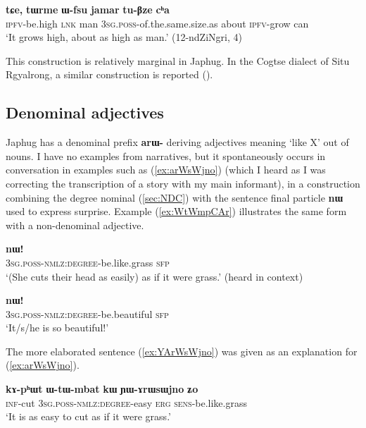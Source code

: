 \documentclass[oneside,a4paper,11pt]{article}
\newcommand{\ipa}[1]{{\phon\textbf{#1}}}
\begin{document}
\begin{exe}
\ex \label{ex:Wfsu}
\gll \ipa{tu-mbro} 	\ipa{tɕe,} 	\ipa{tɯrme} 	\ipa{ɯ-fsu} 	\ipa{jamar} 	\ipa{tu-βze} 	\ipa{cʰa} \\
\textsc{ipfv}-be.high \textsc{lnk} man \textsc{3sg.poss}-of.the.same.size.as about \textsc{ipfv}-grow can \\
\glt `It grows high, about as high as man.' (12-ndZiNgri, 4)
\end{exe}

This construction is relatively marginal in Japhug. In the Cogtse dialect of Situ Rgyalrong, a similar construction is reported (\citealt[377]{linxr93jiarong}).

\subsection{Denominal adjectives} \label{sec:denominal}
Japhug has a denominal prefix \ipa{arɯ-} deriving adjectives meaning `like X' out of nouns. I have no examples from narratives, but it spontaneously occurs in conversation  in examples such as (\ref{ex:arWsWjno}) (which I heard as I was correcting the transcription of a story with my main informant), in a construction combining the degree nominal (\ref{sec:NDC}) with the sentence final particle \ipa{nɯ} used to express surprise. Example (\ref{ex:WtWmpCAr}) illustrates the same form with a non-denominal adjective.

\begin{exe}
\ex \label{ex:arWsWjno}
\gll \ipa{ɯ-tɯ-ɤrɯsɯjno} 	\ipa{nɯ!}  \\
\textsc{3sg.poss-nmlz:degree}-be.like.grass \textsc{sfp} \\
\glt `(She cuts their head as easily) as if it were grass.' (heard in context)
\end{exe}

\begin{exe}
\ex \label{ex:WtWmpCAr}
\gll \ipa{ɯ-tɯ-mpɕɤr} 	\ipa{nɯ!}  \\
\textsc{3sg.poss-nmlz:degree}-be.beautiful \textsc{sfp} \\
\glt `It/s/he is so beautiful!'
\end{exe}

The more elaborated sentence (\ref{ex:YArWsWjno}) was given as an explanation for (\ref{ex:arWsWjno}).

\begin{exe}
\ex \label{ex:YArWsWjno}
\gll  
\ipa{kɤ-pʰɯt} 	\ipa{ɯ-tɯ-mbat} 	\ipa{kɯ} 	\ipa{ɲɯ-ɤrɯsɯjno} 	\ipa{ʑo} \\
\textsc{inf}-cut  \textsc{3sg.poss-nmlz:degree}-easy \textsc{erg} \textsc{sens}-be.like.grass \\
\glt `It is as easy to cut as if it were grass.' 
\end{exe}
\end{document}
